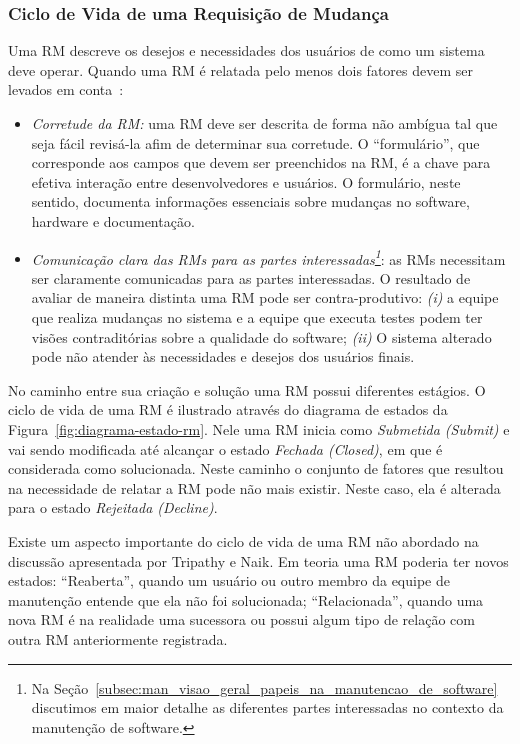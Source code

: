\subsubsection{Ciclo de Vida de uma Requisição de Mudança}\label{sub:fluxo_de_trabalho_requisicao_mudanca}

Uma RM descreve os desejos e necessidades dos usuários de como um sistema deve
operar. Quando uma RM é relatada pelo menos dois fatores devem ser levados em
conta~\cite{tripathy2014software}:

\begin{itemize}
    \item \textit{Corretude da RM:} uma RM deve ser descrita de forma não
        ambígua tal que seja fácil revisá-la afim de determinar sua corretude.
        O ``formulário'', que corresponde aos campos que devem ser preenchidos
        na RM, é a chave para efetiva interação entre desenvolvedores e
        usuários. O formulário, neste sentido, documenta informações essenciais
        sobre mudanças no software, hardware e documentação.
   \item \textit{Comunicação clara das RMs para as partes
           interessadas\footnote{Na
               Seção~\ref{subsec:man_visao_geral_papeis_na_manutencao_de_software}
               discutimos em maior detalhe as diferentes partes interessadas
               no contexto da manutenção de software.}}: as RMs necessitam ser
       claramente comunicadas para as partes interessadas. O resultado de
       avaliar de maneira distinta uma RM pode ser contra-produtivo:
       \textit{(i)} a equipe que realiza mudanças no sistema e a equipe que
       executa testes podem ter visões contraditórias sobre a qualidade do
       software; \textit{(ii)} O sistema alterado pode não atender às
       necessidades e desejos dos usuários finais.
\end{itemize}

No caminho entre sua criação e solução uma RM possui diferentes estágios. O
ciclo de vida de uma RM é ilustrado através do diagrama de estados da
Figura~\ref{fig:diagrama-estado-rm}. Nele uma RM inicia como \textit{Submetida
    (Submit)} e vai sendo modificada até alcançar o estado \textit{Fechada
    (Closed)}, em que é considerada como solucionada. Neste caminho o conjunto
de fatores que resultou na necessidade de relatar a RM pode não mais existir.
Neste caso, ela é alterada para o estado \textit{Rejeitada (Decline)}.

Existe um aspecto importante do ciclo de vida de uma RM não abordado na
discussão apresentada por Tripathy e Naik. Em teoria uma RM poderia ter novos
estados: ``Reaberta'', quando um usuário ou outro membro da equipe de
manutenção entende que ela não foi solucionada; ``Relacionada'', quando uma
nova RM é na realidade uma sucessora ou possui algum tipo de relação com outra
RM anteriormente registrada.

